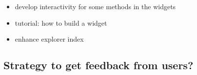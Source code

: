 \documentclass{deliverablereport}
\begin{document}
\begin{itemize}
\item develop interactivity for some methods in the widgets
\item tutorial: how to build a widget
\item enhance explorer index
\end{itemize}

\subsection{Strategy to get feedback from users?}


\appendix

\end{document}
